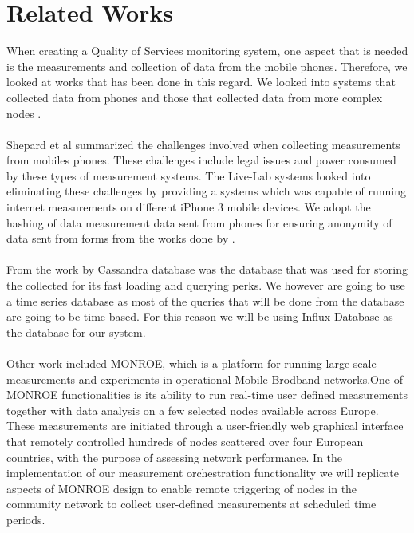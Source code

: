 \section{Related Works}
When creating a Quality of Services monitoring system, one aspect that is needed is the measurements and collection of data from the mobile phones. Therefore, we looked at works that has been done in this regard. We looked into systems that collected data from phones and those that collected data from more complex nodes \cite{7523537, Shepard:2011:LMW:1925019.1925023}. 
\paragraph{}
Shepard et al \cite{Shepard:2011:LMW:1925019.1925023} summarized the challenges involved when collecting measurements from mobiles phones. These challenges include legal issues and power consumed by these types of measurement systems. The Live-Lab systems \cite{Shepard:2011:LMW:1925019.1925023} looked into eliminating these challenges by providing a systems which was capable of running internet measurements on different iPhone 3 mobile devices. We adopt the hashing of data measurement data sent from phones for ensuring anonymity of data sent from forms from the works done by \cite{Shepard:2011:LMW:1925019.1925023}.
\paragraph{}
From the work by \cite{7523537,8255998} Cassandra database was the database that was used for storing the collected for its fast loading and querying perks. We however are going to use a time series database as most of the queries that will be done from the database are going to be time based. For this reason we will be using Influx Database as the database for our system.

\paragraph{}
Other work included MONROE, which is a platform for running large-scale measurements and experiments in operational Mobile Brodband networks\cite{7523537}.One of MONROE functionalities is its ability to run real-time user defined measurements together with data analysis on a few selected nodes available across Europe\cite{7523537}. These measurements are initiated through a user-friendly web graphical interface that remotely controlled hundreds of nodes scattered over four European countries, with the purpose of assessing network performance\cite{7523537}. In the implementation of our measurement orchestration functionality we will replicate aspects of MONROE design to enable remote triggering of nodes in the community network to collect user-defined measurements at scheduled time periods. 

